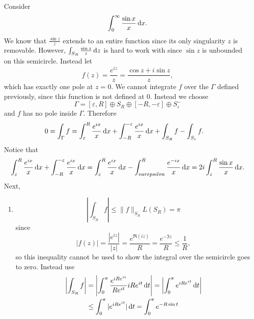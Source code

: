 \begin{xmpl}
  Consider
  $$
  \int_0^\infty \frac{\sin x}{x} \mathop{}\!\mathrm{d} x.
  $$
  We know that $\frac{\sin z}{z}$ extends to an entire function
  since its only singularity $z$ is removable. However,
  $\int_{S_R} \frac{\sin z}{z} \mathop{}\!\mathrm{d} z$ is hard to work with since
  $\sin z$ is unbounded on this semicircle. Instead let
  $$
  f(z) = \frac{e^{iz}}{z} = \frac{\cos z + i \sin z}{z},
  $$
  which has exactly one pole at $z = 0$. We cannot integrate $f$ over
  the $\Gamma$ defined previously, since this function is not defined
  at 0. Instead we choose
  $$
    \Gamma
  = [\varepsilon, R]
  \oplus S_R
  \oplus [-R, -\varepsilon]
  \oplus S_{\varepsilon}^{-}
  $$
  and $f$ has no pole inside $\Gamma$. Therefore
  \begin{align*}
     0
  &= \int_{\Gamma} f
   = \int_{\varepsilon}^R
       \frac{e^{ix}}{x}
       \mathop{}\!\mathrm{d} x
   + \int_{-R}^{-\varepsilon}
       \frac{e^{ix}}{x}
       \mathop{}\!\mathrm{d} x
   + \int_{S_R} f
   - \int_{S_\varepsilon} f.
  \end{align*}
  Notice that
  \begin{align*}
    \int_\varepsilon^R
      \frac{e^{ix}}{x}
      \mathop{}\!\mathrm{d} x
  + \int_{-R}^{-\varepsilon}
      \frac{e^{ix}}{x}
      \mathop{}\!\mathrm{d} x
  = \int_\varepsilon^R
      \frac{e^{ix}}{x}
      \mathop{}\!\mathrm{d} x
  - \int_{varepsilon}^R
      \frac{e^{-ix}}{x}
      \mathop{}\!\mathrm{d} x
  = 2i
    \int_\varepsilon^R
      \frac{\sin x}{x}
      \mathop{}\!\mathrm{d} x.
  \end{align*}
  Next,
  \begin{enumerate}
    \item{
      $$
           \left|
             \int_{S_R} f
           \right|
      \leq \| f \|_{S_R} L(S_R)
      =    \pi
      $$
      since
      $$
        |f(z)|
      = \frac{|e^{iz}|}{|z|}
      = \frac{e^{\Re (i z)}}{R}
      = \frac{e^{-\Im z}}{R}
      \leq \frac{1}{R},
      $$
      so this inequality cannot be used to show
      the integral over the semicircle goes to zero.
      Instead use
      \begin{align*}
            \left|
              \int_{S_R} f
            \right|
      &=    \left|
              \int_0^\pi
                \frac{e^{i R e^{it}}}{Re^{it}}
                i R e^{it}
                \dif t
            \right|
       =    \left|
              \int_0^\pi
                e^{i R e^{it}}
                \dif t
            \right| \\
      &\leq \int_0^\pi
              |e^{i R e^{it}}|
              \dif t
       =    \int_0^\pi
              e^{-R \sin t}

\end{align*}}
\end{enumerate}
\end{xmpl}
